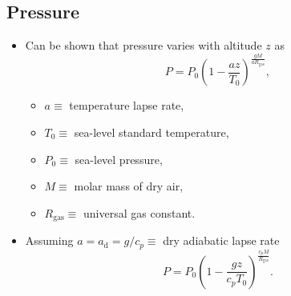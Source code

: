 \documentclass[11pt, oneside]{article}
\begin{document}
\subsection{Pressure}
\label{s:pres}

\begin{itemize}
	\item Can be shown that pressure varies with altitude $z$ as
	\begin{equation}
		\label{e:P}
		P = P_0\left(1 - \frac{az}{T_0}\right)^{\frac{gM}{aR_\mathrm{gas}}},
	\end{equation}
	\begin{itemize}
		\item[] $a \equiv$ temperature lapse rate,
		\item[] $T_0 \equiv$ sea-level standard temperature,
		\item[] $P_0 \equiv$ sea-level pressure,
		\item[] $M \equiv$ molar mass of dry air,
		\item[] $R_\mathrm{gas} \equiv$ universal gas constant.
	\end{itemize}
	\item Assuming $a = a_\mathrm{d} = g/c_p \equiv$ dry adiabatic lapse rate
	\begin{equation}
		\label{e:Pd}
		P = P_0\left(1 - \frac{gz}{c_pT_0}\right)^{\frac{c_pM}{R_\mathrm{gas}}}.
	\end{equation}

\end{itemize}
\end{document}
